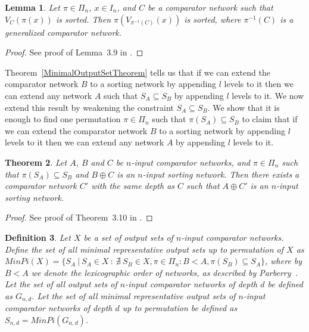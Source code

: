 \documentclass[13pt,a4paper]{article}
\newtheorem{theorem}{Theorem}[section]
\newtheorem{lemma}[theorem]{Lemma}
\newtheorem{definition}[theorem]{Definition}
\begin{document}
\begin{lemma}
\label{lemma:PermutationSet}
Let $\pi \in \Pi_n$, $x \in I_n$, and $C$ be a comparator network such that $V_C(\pi(x))$ is sorted. Then $\pi(V_{\pi^{-1}(C)}(x))$ is sorted, where $\pi^{-1}(C)$ is a generalized comparator network.
\end{lemma}

\begin{proof}
See proof of Lemma~3.9 in \cite{Marinov:SortingNetworks:ThirdLevel}.
\end{proof}

Theorem~\ref{MinimalOutputSetTheorem} tells us that if we can extend the comparator network $B$ to a sorting network by appending $l$ levels to it then we can extend any network $A$ such that $S_A \subseteq S_B$ by appending $l$ levels to it. We now extend this result by weakening the constraint $S_A \subseteq S_B$. We show that it is enough to find one permutation $\pi \in \Pi_n$ such that $\pi(S_A) \subseteq S_B$ to claim that if we can extend the comparator network $B$ to a sorting network by appending $l$ levels to it then we can extend any network $A$ by appending $l$ levels to it.

\begin{theorem}
\label{MinimalPermutationOutputSetTheorem}
Let $A$, $B$ and $C$ be $n$-input comparator networks, and $\pi \in \Pi_n$ such that $ \pi(S_{A}) \subseteq S_{B}$ and $B \oplus C$ is an $n$-input sorting network. Then there exists a comparator network $C'$ with the same depth as $C$ such that $A \oplus C'$ is an $n$-input sorting network.
\end{theorem}

\begin{proof}
See proof of Theorem~3.10 in \cite{Marinov:SortingNetworks:ThirdLevel}.
\end{proof}


\begin{definition}
\label{def:min_pi}
Let $X$ be a set of output sets of $n$-input comparator networks. Define the set of all minimal representative output sets up to permutation of $X$ as $MinPi ( X ) = \{ S_A ~\lvert~ S_A \in X ~:~\nexists~ S_B \in X, \pi \in \Pi_n : B < A, \pi(S_B) \subseteq S_A  \}$, where by $B < A$ we denote the lexicographic order of networks, as described by Parberry~\cite{Parberry89}. Let the set of all output sets of $n$-input comparator networks of depth $d$ be defined as $G_{n,d}$. Let the set of all minimal representative output sets of $n$-input comparator networks of depth $d$ up to permutation be defined as $S_{n,d} = MinPi(G_{n,d})$.
\end{definition}
\end{document}

